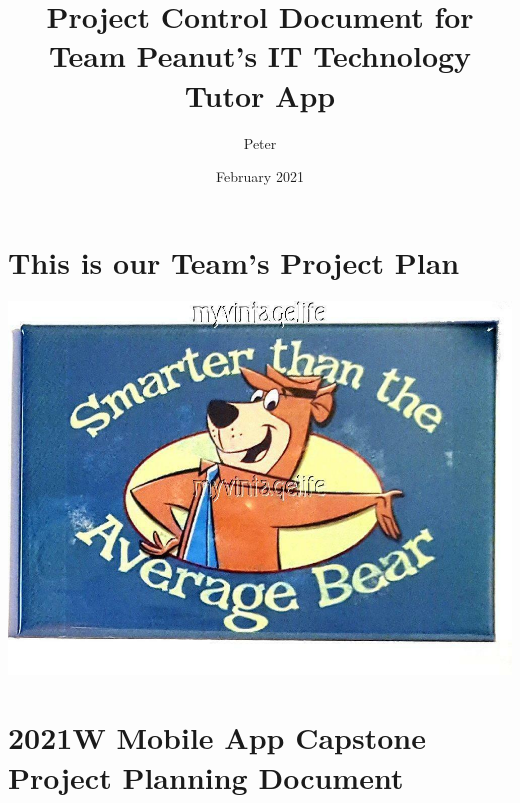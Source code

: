 \documentclass{article}
\title{Project Control Document for Team Peanut's IT Technology Tutor App}
\author{Peter }
\date{February 2021}
\begin{document}
\maketitle

\section*{This is our Team's Project Plan}
\includegraphics[scale=.3]{yogi.jpg}
\section*{2021W Mobile App Capstone Project Planning Document}
\newpage








\end{document}
